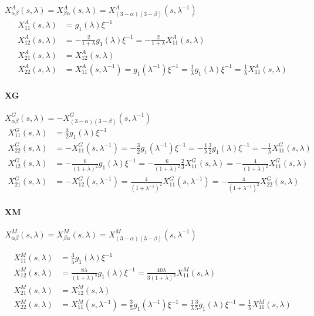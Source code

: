\documentclass[12pt]{article}
\begin{document}
$X_{\alpha\beta}^{A}(s,\lambda)=X_{\beta\alpha}^{A}(s,\lambda) =
X_{(3-\alpha)(3-\beta)}^{A}(s,\lambda^{-1})$
\begin{align}
 X_{11}^{A}(s,\lambda) &= g_1 (\lambda) \xi^{-1} \\
 X_{12}^{A}(s,\lambda) &= - \frac{2}{1+\lambda} g_1 (\lambda) \xi^{-1} 
= -\frac{2}{1+\lambda} X_{11}^{A}(s,\lambda) \\
 X_{21}^{A}(s,\lambda) &=  X_{12}^{A}(s,\lambda) \\
 X_{22}^{A}(s,\lambda) &=  X_{11}^{A}(s,\lambda^{-1}) 
 = g_1(\lambda^{-1})\xi^{-1}
 = \frac{1}{\lambda} g_1(\lambda) \xi^{-1}
 = \frac{1}{\lambda} X_{11}^{A}(s,\lambda) 
\end{align}

\paragraph{XG}
$X_{\alpha\beta}^{G}(s,\lambda) = - X_{(3-\alpha)(3-\beta)}^{G}(s, \lambda^{-1})$
\begin{align}
 X_{11}^{G}(s,\lambda) &= \frac{3}{2}g_1(\lambda) \xi^{-1} \\
 X_{22}^{G}(s,\lambda) &= - X_{11}^{G} (s, \lambda^{-1})
 = - \frac{3}{2}g_1(\lambda^{-1}) \xi^{-1} 
 = - \frac{1}{\lambda} \frac{3}{2}g_1(\lambda) \xi^{-1} 
 = - \frac{1}{\lambda} X_{11}^{G} (s, \lambda) \\
X_{12}^{G}(s,\lambda) &= 
-\frac{6}{(1+\lambda)^2} g_1(\lambda)\xi^{-1} 
= 
-\frac{6}{(1+\lambda)^2} \frac{2}{3} X_{11}^{G}(s,\lambda)
= 
-\frac{4}{(1+\lambda)^2}  X_{11}^{G} (s,\lambda)\\
X_{21}^{G}(s,\lambda) &= 
- X_{12}^{G}(s,\lambda^{-1}) 
= 
\frac{4}{(1+\lambda^{-1})^2}X_{11}^{G}(s,\lambda^{-1})
= 
-\frac{4}{(1+\lambda^{-1})^2}X_{22}^{G}(s,\lambda)
\end{align}

\paragraph{XM}

$X_{\alpha\beta}^{M} (s,\lambda) = 
 X_{\beta\alpha}^{M}(s,\lambda) = 
 X_{(3-\alpha)(3-\beta)}^{M}(s, \lambda^{-1})$

\begin{align}
X_{11}^{M}(s,\lambda)  &= 
\frac{3}{5} g_1(\lambda)\xi^{-1} \\
X_{12}^{M}(s,\lambda)
&= \frac{8\lambda}{(1+\lambda)^3} g_1(\lambda)\xi^{-1} 
= \frac{40\lambda}{3(1+\lambda)^3}  X_{11}^{M}(s,\lambda) \\
X_{21}^{M}(s,\lambda) & = X_{12}^{M}(s,\lambda) \\
X_{22}^{M}(s,\lambda) & = 
X_{11}^{M}(s,\lambda^{-1}) 
=
\frac{3}{5} g_1(\lambda^{-1})\xi^{-1} 
=
\frac{1}{\lambda}
\frac{3}{5} g_1(\lambda)\xi^{-1} 
=
\frac{1}{\lambda}
X_{11}^{M}(s,\lambda)  
\end{align}
\end{document}
